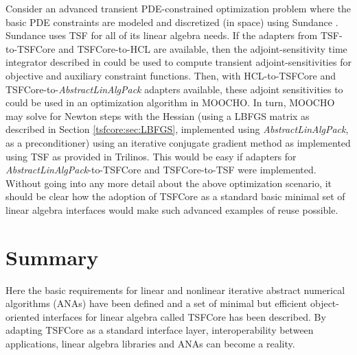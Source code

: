 Consider an advanced transient PDE-constrained optimization problem
where the basic PDE constraints are modeled and discretized (in space)
using Sundance \cite{krlong:Sundance}.  Sundance uses TSF for all of
its linear algebra needs.  If the adapters from TSF-to-TSFCore and
TSFCore-to-HCL are available, then the adjoint-sensitivity time
integrator described in \cite{Gockenbach:2002:EAI} could be used to
compute transient adjoint-sensitivities for objective and auxiliary
constraint functions.  Then, with HCL-to-TSFCore and
TSFCore-to-\textit{AbstractLinAlgPack} adapters available, these
adjoint sensitivities to could be used in an optimization algorithm in
MOOCHO.  In turn, MOOCHO may solve for Newton steps with the Hessian
(using a LBFGS matrix as described in Section \ref{tsfcore:sec:LBFGS},
implemented using
\textit{AbstractLinAlgPack}, as a preconditioner) using an iterative
conjugate gradient method as implemented using TSF as provided in
Trilinos.  This would be easy if adapters for
\textit{AbstractLinAlgPack}-to-TSFCore and TSFCore-to-TSF were implemented.
Without going into any more detail about the above optimization
scenario, it should be clear how the adoption of TSFCore as a standard
basic minimal set of linear algebra interfaces would make such
advanced examples of reuse possible.

%
\section{Summary}
%

Here the basic requirements for linear and nonlinear iterative
abstract numerical algorithms (ANAs) have been defined and a set of
minimal but efficient object-oriented interfaces for linear algebra
called TSFCore has been described.  By adapting TSFCore as a standard
interface layer, interoperability between applications,
linear algebra libraries and ANAs can become a reality.
